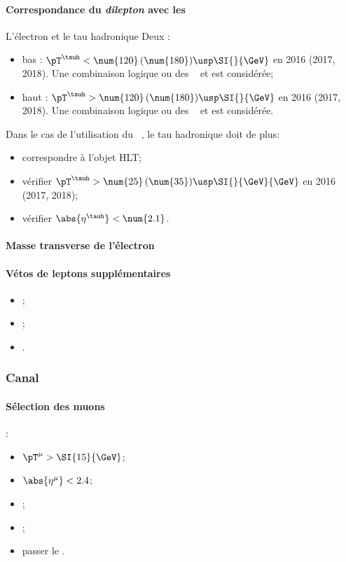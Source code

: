 \paragraph{Correspondance du \emph{dilepton} avec les \HLTpaths}
L'électron et le tau hadronique \FromPairMatchToHLTObjects{}
Deux \HLTregionsDefined:
\begin{itemize}
    \item bas \pT: $\pT^{\tauh} < \num{120} \, (\num{180}) \usp \SI{}{\GeV}$ en 2016 (2017, 2018).
        Une combinaison logique \og ou \fg{} des \HLTpaths\ \HLTSingleEle{} et \HLTEleTauCross{} est considérée;
    \item haut \pT: $\pT^{\tauh} > \num{120} \, (\num{180}) \usp \SI{}{\GeV}$ en 2016 (2017, 2018).
        Une combinaison logique \og ou \fg{} des \HLTpaths\ \HLTSingleEle{} et \HLTSingleTau{} est considérée.
\end{itemize}
Dans le cas de l'utilisation du \HLTpath\ \HLTEleTauCross{}, le tau hadronique doit de plus:
\begin{itemize}
    \item correspondre à l'objet HLT;
    \item vérifier $\pT^{\tauh} > \num{25} \, (\num{35}) \usp \SI{}{\GeV}{\GeV}$ en 2016 (2017, 2018);
    \item vérifier $\abs{\eta^{\tauh}} < \num{2.1}$.
\end{itemize}
\paragraph{Masse transverse de l'électron}
\paragraph{Vétos de leptons supplémentaires}
\LeptonVetoes
\begin{itemize}
    \item \LeptonVetoesExtraMuon;
    \item \LeptonVetoesSecondEle;
    \item \LeptonVetoesElectronPair.
\end{itemize}

\subsubsection{Canal \ele\mu}\label{chapter-HTT_analysis-section-offline-em}
\paragraph{Sélection des muons}
:
\begin{itemize}
    \item $\pT^{\mu} > \SI{15}{\GeV}$;
    \item $\abs{\eta^{\mu}} < 2.4$;
    \item \Leptondzdxy;
    \item {};
    \item passer le \MediumMuonID.
\end{itemize}
